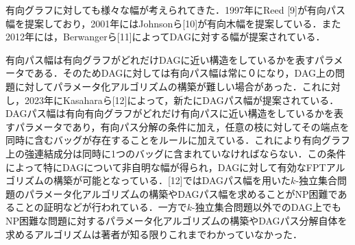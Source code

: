 \documentclass[master]{kuisthesis}		%
\theoremstyle{plain}
\theoremstyle{definition}
\begin{document}
有向グラフに対しても様々な幅が考えられてきた．1997年にReed [9]が有向パス幅を提案しており，2001年にはJohnsonら[10]が有向木幅を提案している．また2012年には，Berwangerら[11]によってDAGに対する幅が提案されている．

有向パス幅は有向グラフがどれだけDAGに近い構造をしているかを表すパラメータである．そのためDAGに対しては有向パス幅は常に０になり，DAG上の問題に対してパラメータ化アルゴリズムの構築が難しい場合があった．これに対し，2023年にKasaharaら[12]によって，新たにDAGパス幅が提案されている．DAGパス幅は有向有向グラフがどれだけ有向パスに近い構造をしているかを表すパラメータであり，有向パス分解の条件に加え，任意の枝に対してその端点を同時に含むバッグが存在することをルールに加えている．これにより有向グラフ上の強連結成分は同時に1つのバッグに含まれていなければならない．この条件によって特にDAGについて非自明な幅が得られ，DAGに対して有効なFPTアルゴリズムの構築が可能となっている．[12]ではDAGパス幅を用いた$k$-独立集合問題のパラメータ化アルゴリズムの構築やDAGパス幅を求めることがNP困難であることの証明などが行われている．一方で$k$-独立集合問題以外でのDAG上でもNP困難な問題に対するパラメータ化アルゴリズムの構築やDAGパス分解自体を求めるアルゴリズムは著者が知る限りこれまでわかっていなかった．
\end{document}
